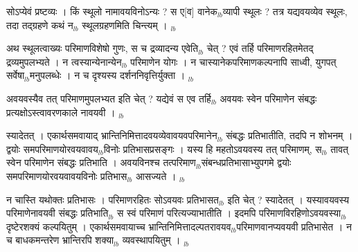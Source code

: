 \documentclass[article,12pt,a4paper]{memoir}%
\newcounter{parCount}
\begin{document}
	  
	  \pstart \leavevmode%
	सोऽप्येवं प्रष्टव्यः । किं स्थूलो नामावयविनोऽन्यः ? स ए[व] वानेक{\tiny $_{lb}$}व्यापी स्थूलः ? तत्र यद्यवयव्येव स्थूलः, तदा \leavevmode{} तद्ग्रहणे कथं न{\tiny $_{lb}$} स्थूलग्रहणमिति चिन्त्यम् ।
	{}
	\pend%
      {\tiny $_{lb}$}

	  
	  \pstart \leavevmode%
	अथ स्थूलत्वाख्यः परिमाणविशेषो गुणः, स च द्रव्यादन्य एवेति{\tiny $_{lb}$} चेत् ? एवं तर्हि परिमाणरहितमेतद् द्रव्यमुपलभ्यते । न त्वस्यान्येनान्येन{\tiny $_{lb}$} \leavevmode{} परिमाणेन योगः । न चास्यानेकपरिमाणकल्पनापि साध्वी, युगपत् सर्वेषा{\tiny $_{lb}$}मनुपलब्धेः । न च दृश्यस्य दर्शननिवृत्तिर्युक्ता ।
	{}
	\pend%
      {\tiny $_{lb}$}

	  
	  \pstart \leavevmode%
	अवयवस्यैव तत् परिमाणमुपलभ्यत इति चेत् ? यद्येवं स एव तर्हि{\tiny $_{lb}$} अवयवः स्वेन परिमाणेन संबद्धः प्रत्यक्षोऽस्त्वावरणकाले नावयवी ।
	{}
	\pend%
      {\tiny $_{lb}$}

	  
	  \pstart \leavevmode%
	स्यादेतत् । एकार्थसमवायाद् भ्रान्तिनिमित्तादवयव्येवावयवपरिमानेन{\tiny $_{lb}$} संबद्धः प्रतिभातीति, तदपि न शोभनम् । द्वयोः समपरिमाणयोरवयवावय{\tiny $_{lb}$}विनोः प्रतिभासप्रसङ्गः । यस्य हि महतोऽवयवस्य तत् परिमाणम्, स{\tiny $_{lb}$} तावत् स्वेन परिमाणेन संबद्धः प्रतिभाति । अवयविनश्च तत्परिमाण{\tiny $_{lb}$}संबन्धप्रतिभासाभ्युपगमे द्वयोः समपरिमाणयोरवयवावयविनोः प्रतिभास{\tiny $_{lb}$} आसज्यते ।
	{}
	\pend%
      {\tiny $_{lb}$}

	  
	  \pstart \leavevmode%
	न चास्ति यथोक्तः प्रतिभासः । परिमाणरहितः सोऽवयवः प्रतिभासत{\tiny $_{lb}$} इति चेत् ? स्यादेतत् । यस्यावयवस्य परिमाणेनावयवी संबद्धः प्रतिभाति{\tiny $_{lb}$} स स्वं परिमाणं परित्यज्याभातीति । इदमपि परिमाणविरहिणोऽवयवस्या{\tiny $_{lb}$}दृष्टेरशक्यं कल्पयितुम् । एकार्थसमवायाच्च भ्रान्तिनिमित्तादल्पतरावयव{\tiny $_{lb}$}परिमाणवानप्यवयवी प्रतिभासेत । न च बाधकमन्तरेण भ्रान्तिरपि शक्या{\tiny $_{lb}$} व्यवस्थापयितुम् ।
	{}
	\pend%
      {\tiny $_{lb}$}
\end{document}

